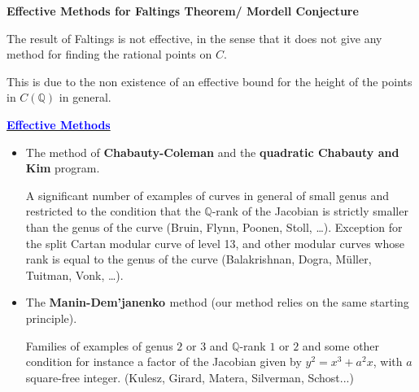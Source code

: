 \documentclass[12pt]{beamer}
\newcommand{\qe}{\mathbb{Q}}
\begin{document}
\begin{frame}{\bf Effective Methods for Faltings Theorem/ Mordell Conjecture}
\begin{alertblock}{}
The result of Faltings is not effective, in the sense that it does not give any method for finding the rational points on $C$.


This is due to the non existence of an effective bound for the height of the points in $C(\qe)$ in general.
\end{alertblock}
 \begin{tcolorbox}{\Large \underline{\bf \textcolor{blue}{Effective Methods}}}
\begin{itemize} 

\item The method of {\bf Chabauty-Coleman}  and the {\bf quadratic Chabauty and Kim} program.

A significant number of examples of curves in general of small genus and restricted to the condition that the $\mathbb{Q}$-rank  of the Jacobian is strictly smaller than the genus of the curve (Bruin, Flynn, Poonen, Stoll, \dots). Exception for the split Cartan modular curve of level 13, and other modular curves whose rank is equal to the genus of the curve (Balakrishnan, Dogra, M\"uller, Tuitman, Vonk, \dots). \\


\item  The {\bf  {Manin-Dem'janenko }}method (our method relies on the same starting principle).

Families of examples of genus $2$ or $3$ and $\qe$-rank $1$ or $2$ and some other condition for instance a factor of the Jacobian given by $y^2=x^3+a^2 x$, with $a$  square-free integer. (Kulesz, Girard, Matera, Silverman, Schost...)

\end{itemize}
\end{tcolorbox}
\end{frame}
\end{document}
